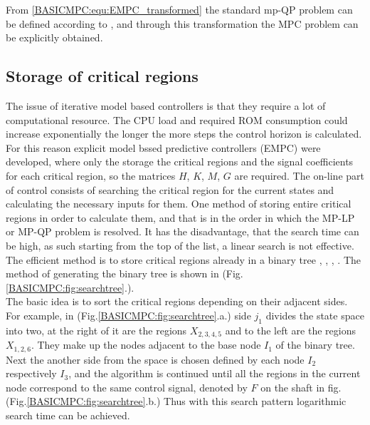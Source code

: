 		From \ref{BASICMPC:equ:EMPC_transformed} the standard mp-QP problem can be defined according to \cite{borrelli2017predictive}, and through this transformation the MPC problem can be explicitly obtained.
		

\subsection{Storage of critical regions}\label{BASICCSR:sec:EMPCStorage}

The issue of iterative model based controllers is that they require a lot of computational resource. The CPU load and required ROM consumption could increase exponentially the longer the more steps the control horizon is calculated. For this reason explicit model bssed predictive controllers (EMPC) were developed, where only the storage the critical regions and the signal coefficients for each critical region, so the matrices $H$, $K$, $M$, $G$ are required. The on-line part of control consists of searching the critical region for the current states and calculating the necessary inputs for them.
One method of storing entire critical regions in order to calculate them, and that is in the order in which the MP-LP or MP-QP problem is resolved. It has the disadvantage, that the search time can be high, as such starting from the top of the list, a linear search is not effective. The efficient method is to store critical regions already in a binary tree \cite{jones2006logarithmic}, \cite{tondel2003evaluation}, \cite{tondel2003constrained}, \cite{kutasi2008vector}. The method of generating the binary tree is shown in (Fig.\ref{BASICMPC:fig:searchtree}.).\\
 The basic idea is to sort the critical regions depending on their adjacent sides. For example, in (Fig.\ref{BASICMPC:fig:searchtree}.a.) side $j_1$ divides the state space into two, at the right of it are the regions $X_{2,3,4,5}$ and to the left are the regions $X_{1,2,6}$. They make up the nodes adjacent to the base node $I_1$ of the binary tree. Next the another side from the space is chosen defined by each node $I_2$ respectively $I_3$, and the algorithm is continued until all the regions in the current node correspond to the same control signal, denoted by $F$ on the shaft in fig. (Fig.\ref{BASICMPC:fig:searchtree}.b.) Thus with this search pattern logarithmic search time can be achieved.

